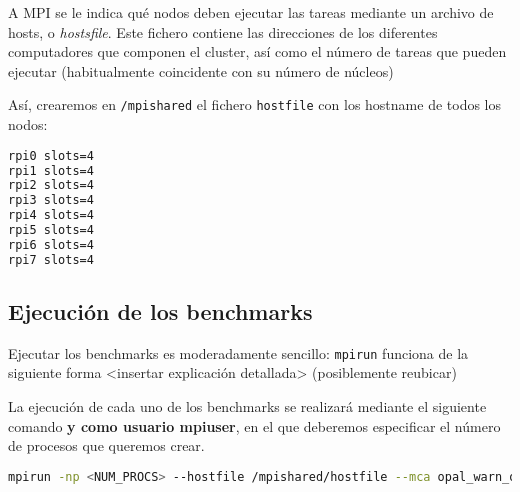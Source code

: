 A MPI se le indica qué nodos deben ejecutar las tareas mediante un archivo de hosts, o \textit{hostsfile}\cite{mpi_hostfile_option}. Este fichero contiene las direcciones de los diferentes computadores que componen el cluster, así como el número de tareas que pueden ejecutar (habitualmente coincidente con su número de núcleos)

Así, crearemos en \texttt{/mpishared} el fichero \texttt{hostfile} con los hostname de todos los nodos:

\begin{lstlisting}[language=bash]
rpi0 slots=4
rpi1 slots=4
rpi2 slots=4
rpi3 slots=4
rpi4 slots=4
rpi5 slots=4
rpi6 slots=4
rpi7 slots=4
\end{lstlisting}

\subsection{Ejecución de los benchmarks}
Ejecutar los benchmarks es moderadamente sencillo: \texttt{mpirun} funciona de la siguiente forma <insertar explicación detallada> (posiblemente reubicar)

La ejecución de cada uno de los benchmarks se realizará mediante el siguiente comando \textbf{y como usuario mpiuser}, en el que deberemos especificar el número de procesos que queremos crear.

\begin{lstlisting}[language=bash]
mpirun -np <NUM_PROCS> --hostfile /mpishared/hostfile --mca opal_warn_on_missing_libcuda 0 /mpishared/NPB3.4.2/NPB3.4-MPI/bin/<KERNEL>.<CLASS>.x
\end{lstlisting}

